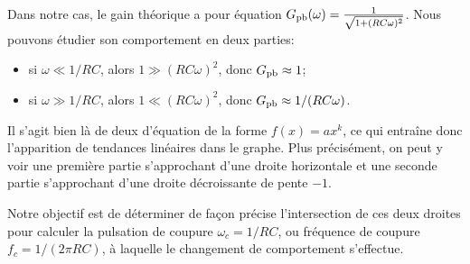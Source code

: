 Dans notre cas, le gain théorique a pour équation
$G_{\mathrm{pb}}(\omega) = \frac{1}{\sqrt{1+(RC\omega)^2}}$.
Nous pouvons étudier son comportement en deux parties:
\begin{itemize}
    \item si $\omega \ll 1/RC$, alors $1 \gg (RC\omega)^2$,
        donc $G_{\mathrm{pb}} \approx 1$;
    \item si $\omega \gg 1/RC$, alors $1 \ll (RC\omega)^2$,
        donc $G_{\mathrm{pb}} \approx 1/(RC\omega)$.
\end{itemize}

Il s'agit bien là de deux d'équation de la forme $f(x) = ax^k$,
ce qui entraîne donc l'apparition de tendances linéaires dans le graphe.
Plus précisément, on peut y voir
une première partie s'approchant d'une droite horizontale et
une seconde partie s'approchant d'une droite décroissante
de pente $-1$.

Notre objectif est de déterminer de façon précise
l'intersection de ces deux droites
pour calculer la pulsation de coupure $\omega_c=1/RC$,
ou fréquence de coupure $f_c=1/(2\pi RC)$,
à laquelle le changement de comportement s'effectue.
